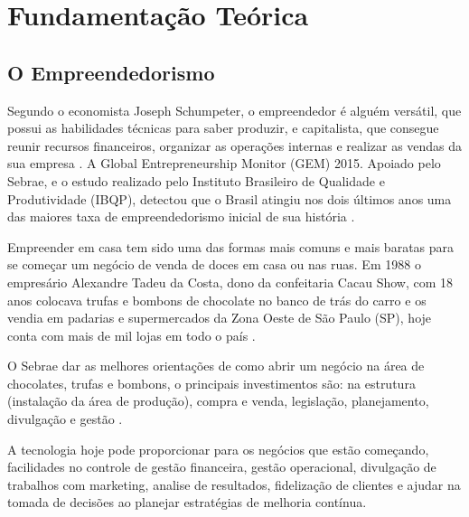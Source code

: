 
\chapter{Fundamentação Teórica}
\thispagestyle{empty}


\section{O Empreendedorismo}

Segundo o economista Joseph Schumpeter, o empreendedor é alguém versátil, que possui as habilidades técnicas para saber produzir, e capitalista, que consegue reunir recursos financeiros, organizar as operações internas e realizar as vendas da sua empresa \cite{Castor:2009}. A Global Entrepreneurship Monitor (GEM) 2015. Apoiado pelo Sebrae, e o estudo realizado pelo Instituto Brasileiro de Qualidade e Produtividade (IBQP), detectou que o Brasil atingiu nos dois últimos anos uma das maiores taxa de empreendedorismo inicial de sua história \cite{EmpreenderBrasil}.

Empreender em casa tem sido uma das formas mais comuns e mais baratas para se começar um negócio de venda de doces em casa ou nas ruas. Em 1988 o empresário Alexandre Tadeu da Costa, dono da confeitaria Cacau Show, com 18 anos colocava trufas e bombons de chocolate no banco de trás do carro e os vendia em padarias e supermercados da Zona Oeste de São Paulo (SP), hoje conta com mais de mil lojas em todo o país \cite{negociodozero}. 

O Sebrae dar as melhores orientações de como abrir um negócio na área de chocolates, trufas e bombons, o principais investimentos são: na estrutura (instalação da área de produção), compra e venda, legislação, planejamento, divulgação e gestão \cite{sebraenegociodoces}. 

A tecnologia hoje pode proporcionar para os negócios que estão começando, facilidades no controle de gestão financeira, gestão operacional, divulgação de trabalhos com marketing, analise de resultados, fidelização de clientes e ajudar na tomada de decisões ao planejar estratégias de melhoria contínua.


